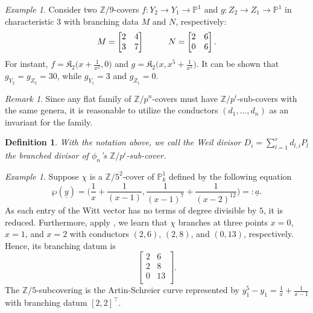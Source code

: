 \documentclass{compositio}
\newcommand{\mat}[1]{\todo[color=green]{MH: #1}}
\newtheorem{definition}[theorem]{Definition}
\theoremstyle{remark}
\newtheorem{example}[theorem]{Example}
\theoremstyle{remark}
\newtheorem{remark}[theorem]{Remark}
\DeclareMathOperator{\ASW}{\mathcal{ASW}}
\begin{document}
\begin{example}
    \label{examplesameendsdifferent}
Consider two $\mathbb{Z}/9$-covers $f: Y_2 \rightarrow Y_1 \rightarrow \mathbb{P}^1$ and $g: Z_2 \rightarrow Z_1 \rightarrow \mathbb{P}^1$ in characteristic 3 with branching data $M$ and $N$, respectively:
\begin{equation*}
M=\begin{bmatrix}
2 & 4 \\
3 & 7 \\
\end{bmatrix} \hspace{10mm} N=\begin{bmatrix}
2 & 6 \\
0 & 6 \\
\end{bmatrix}.
\end{equation*}
For instant, $f=\mathfrak{K}_{2}\big(x+\frac{1}{x^2}, 0\big)$ and $g=\mathfrak{K}_2\big(x, x^5+\frac{1}{x^5} \big)$. It can be shown that $g_{Y_2}=g_{Z_2}=30$, while $g_{Y_1}=3$ and $g_{Z_1}=0$.
\end{example}

\begin{remark}
    Since any flat family of $\mathbb{Z}/p^n$-covers must have $\mathbb{Z}/p^i$-sub-covers with the same genera, it is reasonable to utilize the conductors $(d_1, \ldots, d_n)$ as an invariant for the family.
\end{remark}



\begin{definition}
With the notation above, we call the Weil divisor $D_i=\sum_{l=1}^r d_{l,i} P_l$ the \textit{branched divisor} of $\phi_n$'s $\mathbb{Z}/p^i$-sub-cover.
\end{definition}

\begin{example}
Suppose $\chi$ is a $\mathbb{Z}/5^2$-cover of $\mathbb{P}^1_k$ defined by the following equation
\[ \wp(\underline{y})= \bigg( \frac{1}{x}+\frac{1}{(x-1)}, \frac{1}{(x-1)^7}+\frac{1}{(x-2)^{12}} \bigg)=:\underline{a}. \]
As each entry of the Witt vector has no terms of degree divisible by $5$, it is reduced. Furthermore, apply \cite[Theorem 1]{MR1935414}, we learn that $\chi$ branches at three points $x=0$, $x=1$, and $x=2$ with conductors $(2, 6)$, $(2, 8)$, and $(0, 13)$, respectively. Hence, its branching datum is
\[ \begin{bmatrix}
2 & 6 \\
2 & 8 \\
0 & 13 \\
\end{bmatrix}. \]
The $\mathbb{Z}/5$-subcovering is the Artin-Schreier curve represented by $y_1^5-y_1=\frac{1}{x}+\frac{1}{x-1}$ with branching datum $[2,2]^{\top}$.
\end{example}
\end{document}
